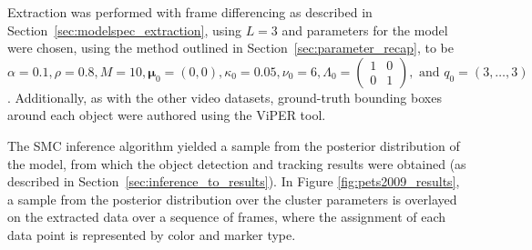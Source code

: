 \documentclass[smallcondensed, final]{svjour3}
\begin{document}
Extraction was performed with frame differencing as described in Section~\ref{sec:modelspec_extraction}, using $L=3$ and parameters for the model were chosen, using the method outlined in Section~\ref{sec:parameter_recap}, to be $\alpha = 0.1, \rho = 0.8, M = 10, \boldsymbol{\mu}_{0} = (0,0), \kappa_{0} = 0.05, \nu_{0} = 6, \Lambda_{0} = \left( \begin{smallmatrix} 1&0\\ 0&1 \end{smallmatrix} \right), \text{ and } q_{0} = (3, \ldots, 3)$. Additionally, as with the other video datasets, ground-truth bounding boxes around each object were authored using the ViPER tool.

The SMC inference algorithm yielded a sample from the posterior distribution of the model, from which the object detection and tracking results were obtained (as described in Section~\ref{sec:inference_to_results}). In Figure \ref{fig:pets2009_results}, a sample from the posterior distribution over the cluster parameters is overlayed on the extracted data over a sequence of frames, where the assignment of each data point is represented by color and marker type.
\end{document}
